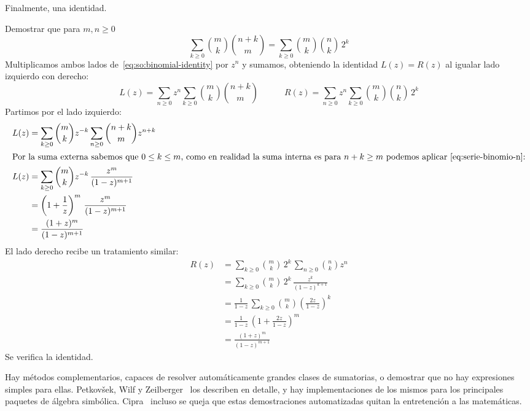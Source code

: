   Finalmente,
  una identidad.
  \begin{example}
    Demostrar que para \(m, n \ge 0\)
    \begin{equation}
      \label{eq:so:binomial-identity}
      \sum_{k \ge 0} \binom{m}{k} \binom{n + k}{m}
	= \sum_{k \ge 0} \binom{m}{k} \binom{n}{k} \, 2^k
    \end{equation}
    Multiplicamos
    ambos lados de~\eqref{eq:so:binomial-identity} por \(z^n\)
    y sumamos,
    obteniendo la identidad \(L(z) = R(z)\)
    al igualar lado izquierdo con derecho:
    \begin{equation*}
      L(z)
	= \sum_{n \ge 0} z^n
	    \sum_{k \ge 0} \binom{m}{k} \binom{n + k}{m}
      \hspace{3em}
      R(z)
	= \sum_{n \ge 0} z^n
	    \sum_{k \ge 0} \binom{m}{k} \binom{n}{k} \, 2^k
    \end{equation*}
    Partimos por el lado izquierdo:
    \begin{align*}
      L(z)
	&= \sum_{k \ge 0} \binom{m}{k} z^{-k}
	     \sum_{n \ge 0} \binom{n + k}{m} z^{n + k} \\
    \intertext{Por la suma externa sabemos que \(0 \le k \le m\),
	       como en realidad la suma interna
	       es para \(n + k \ge m\)
	       podemos aplicar~\eqref{eq:serie-binomio-n}:}
      L(z)
	&= \sum_{k \ge 0} \binom{m}{k} z^{-k} \,
	     \frac{z^m}{(1 - z)^{m + 1}} \\
	&= \left( 1 + \frac{1}{z} \right)^m \,
	     \frac{z^m}{(1 - z)^{m + 1}} \\
	&= \frac{(1 + z)^m}{(1 - z)^{m + 1}}
    \end{align*}
    El lado derecho recibe un tratamiento similar:
    \begin{align*}
      R(z)
	&= \sum_{k \ge 0} \binom{m}{k} \, 2^k \,
	     \sum_{n \ge 0} \binom{n}{k} z^n \\
	&= \sum_{k \ge 0}
	     \binom{m}{k} \, 2^k \,\frac{z^k}{(1 - z)^{k + 1}} \\
	&= \frac{1}{1 - z} \,
	     \sum_{k \ge 0} \binom{m}{k}
	       \left( \frac{2 z}{1 - z} \right)^k \\
	&= \frac{1}{1 - z}
	     \, \left( 1 + \frac{2 z}{1 - z} \right)^m \\
	&= \frac{(1 + z)^m}{(1 - z)^{m + 1}}
    \end{align*}
    Se verifica la identidad.
  \end{example}

  Hay métodos complementarios,
  capaces de resolver automáticamente grandes clases de sumatorias,
  o demostrar que no hay expresiones simples para ellas.
  Petkovšek, Wilf y Zeilberger~%
    \cite{petkovsek96:_AeqB}
  los describen en detalle,
  y hay implementaciones de los mismos
  para los principales paquetes de álgebra simbólica.
  Cipra~\cite{cipra89:_grinch_stole_math}
  incluso se queja que estas demostraciones automatizadas
  quitan la entretención a las matemáticas.

